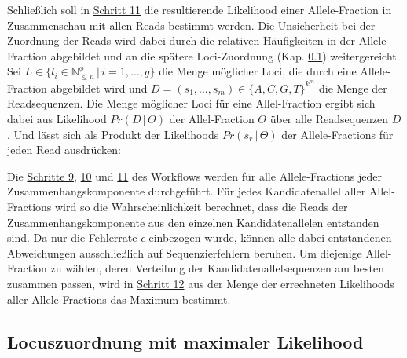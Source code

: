 Schließlich soll in \hyperref[step11]{Schritt 11\label{step11txt}} die resultierende Likelihood einer Allele-Fraction in Zusammenschau mit allen Reads bestimmt werden. Die Unsicherheit bei der Zuordnung der Reads wird dabei durch die relativen Häufigkeiten in der Allele-Fraction abgebildet und an die spätere Loci-Zuordnung (Kap. \ref{subsec:sol_loci_lh}) weitergereicht. Sei $L \in \{l_{i} \in \mathds{N}_{\leq n}^\phi \, | \, i=1, \dots, g\}$ die Menge möglicher Loci, die durch eine Allele-Fraction abgebildet wird und $D = (s_{1}, \dots, s_{m}) \in \{A,C, G, T\}^{k^m}$ die Menge der Readsequenzen. Die Menge möglicher Loci für eine Allel-Fraction ergibt sich dabei aus Likelihood $Pr(D \, | \, \Theta)$ der Allel-Fraction $\Theta$ über alle Readsequenzen $D$. Und lässt sich als Produkt der Likelihoods $Pr(s_{r} \, | \, \Theta)$ der Allele-Fractions für jeden Read ausdrücken: 
\vspace{-0.5cm}
\begin{center}
\end{center}

Die \hyperref[step9]{Schritte 9}, \hyperref[step10]{10} und \hyperref[step11]{11} des Workflows werden für alle Allele-Fractions jeder Zusammenhangskomponente durchgeführt. Für jedes Kandidatenallel aller Allel-Fractions wird so die Wahrscheinlichkeit berechnet, dass die Reads der Zusammenhangskomponente aus den einzelnen Kandidatenallelen entstanden sind. Da nur die Fehlerrate $\epsilon$ einbezogen wurde, können alle dabei entstandenen Abweichungen ausschließlich auf Sequenzierfehlern beruhen. Um diejenige Allel-Fraction zu wählen, deren Verteilung der Kandidatenallelsequenzen am besten zusammen passen, wird in \hyperref[step12]{Schritt 12\label{step12txt}} aus der Menge der errechneten Likelihoods aller Allele-Fractions das Maximum bestimmt.  

\subsection{Locuszuordnung mit maximaler Likelihood} \label{subsec:sol_loci_lh}


